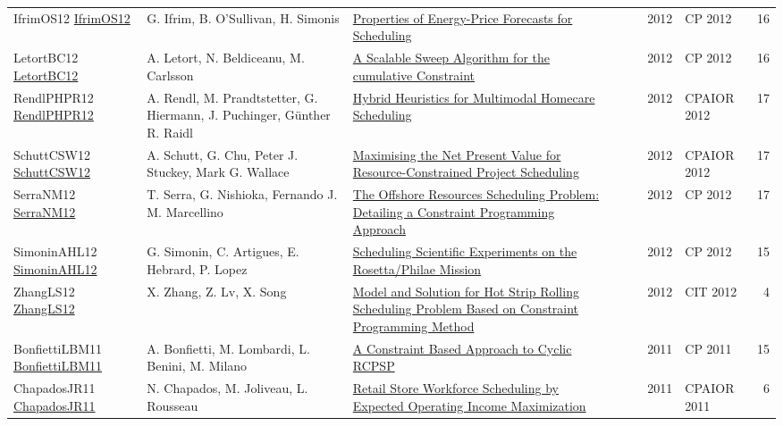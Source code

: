 {\begin{longtable}{p{3cm}p{6cm}p{7cm}rrrp{3cm}r}
IfrimOS12 \href{https://doi.org/10.1007/978-3-642-33558-7\_68}{IfrimOS12} & G. Ifrim, B. O'Sullivan, H. Simonis & \href{papers/IfrimOS12.pdf}{Properties of Energy-Price Forecasts for Scheduling} &  & \cite{IfrimOS12} & 2012 & CP 2012 & 16\\
LetortBC12 \href{https://doi.org/10.1007/978-3-642-33558-7\_33}{LetortBC12} & A. Letort, N. Beldiceanu, M. Carlsson & \href{papers/LetortBC12.pdf}{A Scalable Sweep Algorithm for the cumulative Constraint} &  & \cite{LetortBC12} & 2012 & CP 2012 & 16\\
RendlPHPR12 \href{https://doi.org/10.1007/978-3-642-29828-8\_22}{RendlPHPR12} & A. Rendl, M. Prandtstetter, G. Hiermann, J. Puchinger, G{\"{u}}nther R. Raidl & \href{papers/RendlPHPR12.pdf}{Hybrid Heuristics for Multimodal Homecare Scheduling} &  & \cite{RendlPHPR12} & 2012 & CPAIOR 2012 & 17\\
SchuttCSW12 \href{https://doi.org/10.1007/978-3-642-29828-8\_24}{SchuttCSW12} & A. Schutt, G. Chu, Peter J. Stuckey, Mark G. Wallace & \href{papers/SchuttCSW12.pdf}{Maximising the Net Present Value for Resource-Constrained Project Scheduling} &  & \cite{SchuttCSW12} & 2012 & CPAIOR 2012 & 17\\
SerraNM12 \href{https://doi.org/10.1007/978-3-642-33558-7\_59}{SerraNM12} & T. Serra, G. Nishioka, Fernando J. M. Marcellino & \href{papers/SerraNM12.pdf}{The Offshore Resources Scheduling Problem: Detailing a Constraint Programming Approach} &  & \cite{SerraNM12} & 2012 & CP 2012 & 17\\
SimoninAHL12 \href{https://doi.org/10.1007/978-3-642-33558-7\_5}{SimoninAHL12} & G. Simonin, C. Artigues, E. Hebrard, P. Lopez & \href{papers/SimoninAHL12.pdf}{Scheduling Scientific Experiments on the Rosetta/Philae Mission} &  & \cite{SimoninAHL12} & 2012 & CP 2012 & 15\\
ZhangLS12 \href{https://doi.org/10.1109/CIT.2012.96}{ZhangLS12} & X. Zhang, Z. Lv, X. Song & \href{papers/ZhangLS12.pdf}{Model and Solution for Hot Strip Rolling Scheduling Problem Based on Constraint Programming Method} &  & \cite{ZhangLS12} & 2012 & CIT 2012 & 4\\
BonfiettiLBM11 \href{https://doi.org/10.1007/978-3-642-23786-7\_12}{BonfiettiLBM11} & A. Bonfietti, M. Lombardi, L. Benini, M. Milano & \href{papers/BonfiettiLBM11.pdf}{A Constraint Based Approach to Cyclic {RCPSP}} &  & \cite{BonfiettiLBM11} & 2011 & CP 2011 & 15\\
ChapadosJR11 \href{https://doi.org/10.1007/978-3-642-21311-3\_7}{ChapadosJR11} & N. Chapados, M. Joliveau, L. Rousseau & \href{papers/ChapadosJR11.pdf}{Retail Store Workforce Scheduling by Expected Operating Income Maximization} &  & \cite{ChapadosJR11} & 2011 & CPAIOR 2011 & 6\\

\end{longtable}}
